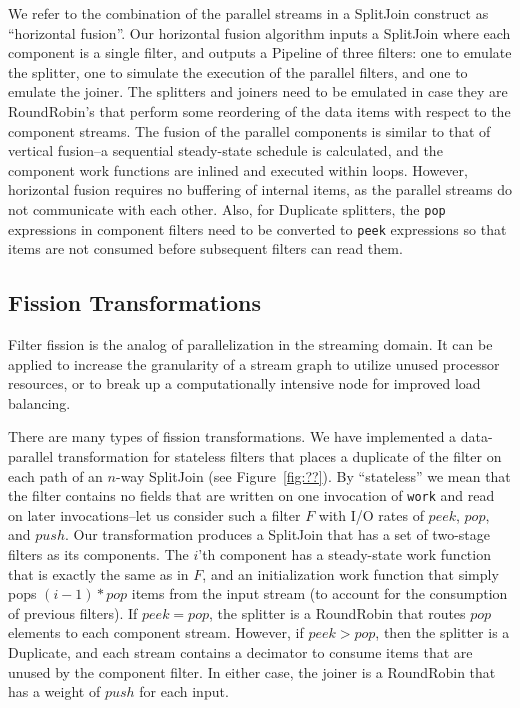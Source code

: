 We refer to the combination of the parallel streams in a SplitJoin
construct as ``horizontal fusion''.  Our horizontal fusion algorithm
inputs a SplitJoin where each component is a single filter, and
outputs a Pipeline of three filters: one to emulate the splitter, one
to simulate the execution of the parallel filters, and one to emulate
the joiner.  The splitters and joiners need to be emulated in case
they are RoundRobin's that perform some reordering of the data items
with respect to the component streams.  The fusion of the parallel
components is similar to that of vertical fusion--a sequential
steady-state schedule is calculated, and the component work functions
are inlined and executed within loops.  However, horizontal fusion
requires no buffering of internal items, as the parallel streams do
not communicate with each other.  Also, for Duplicate splitters, the
{\tt pop} expressions in component filters need to be converted to
{\tt peek} expressions so that items are not consumed before
subsequent filters can read them.

\subsection{Fission Transformations}

Filter fission is the analog of parallelization in the streaming
domain.  It can be applied to increase the granularity of a stream
graph to utilize unused processor resources, or to break up a
computationally intensive node for improved load balancing.  

There are many types of fission transformations.  We have implemented
a data-parallel transformation for stateless filters that places a
duplicate of the filter on each path of an $n$-way SplitJoin (see
Figure~\ref{fig:??}).  By ``stateless'' we mean that the filter
contains no fields that are written on one invocation of {\tt work}
and read on later invocations--let us consider such a filter $F$ with
I/O rates of $peek$, $pop$, and $push$.  Our transformation produces a
SplitJoin that has a set of two-stage filters as its components.  The
$i$'th component has a steady-state work function that is exactly the
same as in $F$, and an initialization work function that simply pops
$(i-1)*pop$ items from the input stream (to account for the
consumption of previous filters).  If $peek=pop$, the splitter is a
RoundRobin that routes $pop$ elements to each component stream.
However, if $peek>pop$, then the splitter is a Duplicate, and each
stream contains a decimator to consume items that are unused by the
component filter.  In either case, the joiner is a RoundRobin that has
a weight of $push$ for each input.

